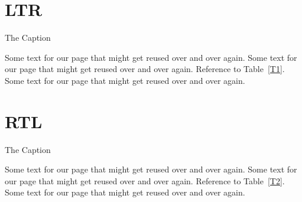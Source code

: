 \documentclass{article}
\newcommand\sample{Some text for our page
  that might get reused over and over again. }
\begin{document}
\section{LTR}
\begin{wraptable}[4]{l}{4cm}
 \centering
{}
 \caption{The Caption}\label{T1}
\end{wraptable}

\sample \sample Reference to Table~\ref{T1}.
\sample

\section{RTL}
\setRTL

\begin{wraptable}[4]{r}{4cm}
 \centering
{}
 \caption{The Caption}\label{T2}
\end{wraptable}

\sample \sample Reference to Table~\ref{T2}.
\sample
\end{document}
